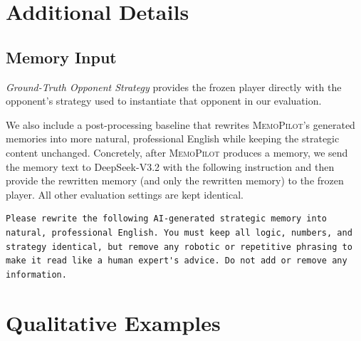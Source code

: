 \documentclass{article}
\newcommand{\methodname}{MemoPilot}
\newcommand{\method}{\textsc{\methodname}}
\theoremstyle{plain}
\theoremstyle{definition}
\theoremstyle{remark}
\begin{document}
\clearpage

\section{Additional Details}

\subsection{Memory Input}\label{appendix:deepseek_rewrite}

\emph{Ground-Truth Opponent Strategy} provides the frozen player directly with the opponent's strategy used to instantiate that opponent in our evaluation.

We also include a post-processing baseline that rewrites \method{}'s generated memories into more natural, professional English while keeping the strategic content unchanged. Concretely, after \method{} produces a memory, we send the memory text to DeepSeek-V3.2 with the following instruction and then provide the rewritten memory (and only the rewritten memory) to the frozen player. All other evaluation settings are kept identical.
\begin{lstlisting}[basicstyle=\scriptsize\ttfamily, breaklines=true]
Please rewrite the following AI-generated strategic memory into natural, professional English. You must keep all logic, numbers, and strategy identical, but remove any robotic or repetitive phrasing to make it read like a human expert's advice. Do not add or remove any information.
\end{lstlisting}

\section{Qualitative Examples}\label{appendix:case_study}

\end{document}
